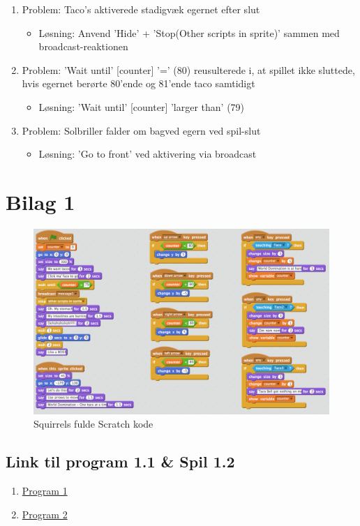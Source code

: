 \documentclass[11pt,a4paper,final]{article}
\begin{document}
\begin{enumerate}
\item{Problem: Taco's aktiverede stadigvæk egernet efter slut}
\begin{itemize}
\item{Løsning: Anvend 'Hide' + 'Stop(Other scripts in sprite)' sammen med broadcast-reaktionen}
\end{itemize}
\item{Problem: 'Wait until' [counter] '=' (80) reusulterede i, at spillet ikke sluttede, hvis egernet berørte 80'ende og 81'ende taco samtidigt}
\begin{itemize}
\item{Løsning: 'Wait until' [counter] 'larger than' (79)}
\end{itemize}
\item{Problem: Solbriller falder om bagved egern ved spil-slut}
\begin{itemize}
\item{Løsning: 'Go to front' ved aktivering via broadcast}
\end{itemize}
\end{enumerate}

\pagebreak
\section*{Bilag 1}
\begin{figure}[H]
\centering
\includegraphics[scale = 0.4]{FullSquirrel.png}
\caption{Squirrels fulde Scratch kode}
\end{figure}

\subsection*{Link til program 1.1 \& Spil 1.2}
\begin{enumerate}
\item{\href{https://scratch.mit.edu/projects/120074250/}{Program 1}}
\item{\href{https://scratch.mit.edu/projects/120075655/}{Program 2}}
\end{enumerate}
\end{document}
